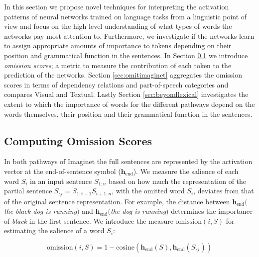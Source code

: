 In this section we propose novel techniques for interpreting the
activation patterns of neural networks trained on language tasks
from a linguistic point of view and focus
on the high level understanding of what types of words the networks
pay most attention to. Furthermore, we investigate if the networks
learn to assign appropriate amounts of importance to tokens depending
on their position and grammatical function in the sentences.\label{edit:whyposdep}
In Section \ref{sec:computeomission} we introduce \emph{omission scores};
a metric to measure the contribution of each token to the prediction of the networks.
Section \ref{sec:omitimaginet} aggregates the omission scores in terms
of dependency relations and part-of-speech categories and compares {\sc Visual}
and {\sc Textual}. Lastly Section \ref{sec:beyondlexical} investigates the extent to which
the importance of words for the different pathways depend on the words themselves,
their position and their grammatical function in the sentences.

\subsection{Computing Omission Scores}
\label{sec:computeomission}

In both pathways of {\sc Imaginet} the full sentences are represented by the
activation vector at the end-of-sentence symbol
($\mathbf{h}_\text{end}$). We measure the salience of each word $S_i$
in an input sentence $S_{1:n}$ based on how much the representation of the
partial sentence $S_{\setminus i} = S_{1:i-1}S_{i+1:n}$, with
the omitted word $S_i$, deviates from that of the original sentence
representation. For example, the distance
between $\mathbf{h}_\text{end}(${\it the black dog is running}$)$
and $\mathbf{h}_\text{end}(${\it the dog is running}$)$ determines
the importance of {\it black} in the first sentence. We introduce the
measure $\mathrm{omission}(i,S)$ for estimating the salience of a word $S_i$:

\begin{equation}
\label{eg:omit}
\mathrm{omission}(i,S) = 1-\mathrm{cosine}(\mathbf{h}_\text{end}(S),
\mathbf{h}_\text{end}(S_{\setminus i}))
\end{equation}

